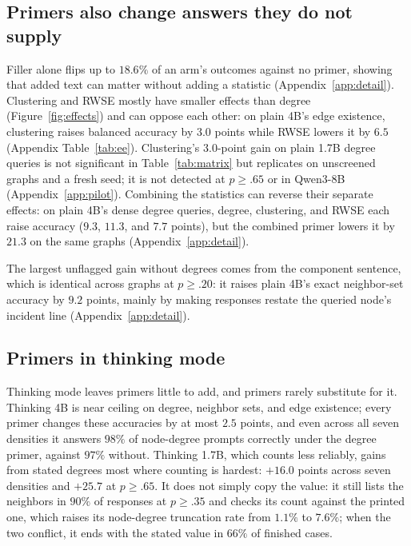 \documentclass[11pt]{article}
\begin{document}
\subsection{Primers also change answers they do not supply}
\label{sec:side}
Filler alone flips up to $18.6\%$ of an arm's outcomes against no primer, showing that added text can matter without adding a statistic (Appendix~\ref{app:detail}). %
Clustering and RWSE mostly have smaller effects than degree (Figure~\ref{fig:effects}) and can oppose each other: on plain 4B's edge existence, clustering raises balanced accuracy by $3.0$ points while RWSE lowers it by $6.5$ (Appendix Table~\ref{tab:ee}). %
Clustering's $3.0$-point gain on plain 1.7B degree queries is not significant in Table~\ref{tab:matrix} but replicates on unscreened graphs and a fresh seed; it is not detected at $p\geq.65$ or in Qwen3-8B (Appendix~\ref{app:pilot}). %
Combining the statistics can reverse their separate effects: on plain 4B's dense degree queries, degree, clustering, and RWSE each raise accuracy ($9.3$, $11.3$, and $7.7$ points), but the combined primer lowers it by $21.3$ on the same graphs (Appendix~\ref{app:detail}). %

The largest unflagged gain without degrees comes from the component sentence, which is identical across graphs at $p\geq.20$: it raises plain 4B's exact neighbor-set accuracy by $9.2$ points, mainly by making responses restate the queried node's incident line (Appendix~\ref{app:detail}). %

\subsection{Primers in thinking mode}
\label{sec:thinkmode}\label{sec:vsthink}
Thinking mode leaves primers little to add, and primers rarely substitute for it. Thinking 4B is near ceiling on degree, neighbor sets, and edge existence; every primer changes these accuracies by at most $2.5$ points, %
and even across all seven densities it answers $98\%$ of node-degree prompts correctly under the degree primer, against $97\%$ without. %
Thinking 1.7B, which counts less reliably, gains from stated degrees most where counting is hardest: $+16.0$ points across seven densities and $+25.7$ at $p\geq.65$. It does not simply copy the value: it still lists the neighbors in $90\%$ of responses at $p\geq.35$ and checks its count against the printed one, which raises its node-degree truncation rate from $1.1\%$ to $7.6\%$; when the two conflict, it ends with the stated value in $66\%$ of finished cases. %
\end{document}
